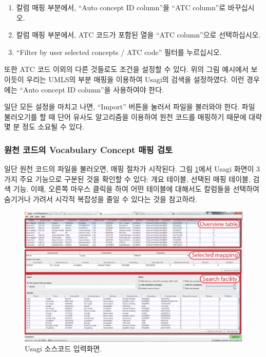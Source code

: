 \documentclass[11pt]{book}
\providecommand{\tightlist}{%
  \setlength{\itemsep}{0pt}\setlength{\parskip}{0pt}}
\theoremstyle{definition}
\theoremstyle{definition}
\theoremstyle{definition}
\theoremstyle{remark}
\begin{document}
\begin{enumerate}
\def\labelenumi{\arabic{enumi}.}
\tightlist
\item
  칼럼 매핑 부분에서, ``Auto concept ID column''을 ``ATC column''로
  바꾸십시오.
\item
  칼럼 매핑 부분에서, ATC 코드가 포함된 열을 ``ATC column''으로
  선택하십시오.
\item
  ``Filter by user selected concepts / ATC code'' 필터를 누르십시오.
\end{enumerate}

또한 ATC 코드 이외의 다른 것들로도 조건을 설정할 수 있다. 위의 그림
예시에서 보이듯이 우리는 UMLS의 부분 매핑을 이용하여 Usagi의 검색을
설정하였다. 이런 경우에는 ``Auto concept ID column''을 사용하여야 한다.

일단 모든 설정을 마치고 나면, ``Import'' 버튼을 눌러서 파일을 불러와야
한다. 파일 불러오기를 할 때 단어 유사도 알고리즘을 이용하여 원천 코드를
매핑하기 때문에 대략 몇 분 정도 소요될 수 있다.

\subsubsection*{원천 코드의 Vocabulary Concept 매핑
검토}\label{--vocabulary-concept--}

일단 원천 코드의 파일을 불러오면, 매핑 절차가 시작된다. 그림
\ref{fig:usagiOverview}에서 Usagi 화면이 3가지 주요 기능으로 구분된 것을
확인할 수 있다: 개요 테이블, 선택된 매핑 테이블, 검색 기능. 이때, 오른쪽
마우스 클릭을 하여 어떤 테이블에 대해서도 칼럼들을 선택하여 숨기거나
가려서 시각적 복잡성을 줄일 수 있다는 것을 참고하라.

\begin{figure}

{\centering \includegraphics[width=1\linewidth]{images/ExtractTransformLoad/usagiOverview} 

}

\caption{Usagi 소스코드 입력화면.}\label{fig:usagiOverview}
\end{figure}
\end{document}
